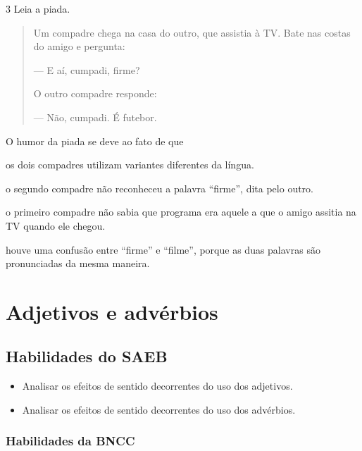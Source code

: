 \num{3} Leia a piada.

\begin{quote}
Um compadre chega na casa do outro, que assistia à TV. Bate nas costas do amigo e pergunta:

--- E aí, cumpadi, firme?

O outro compadre responde:

--- Não, cumpadi. É futebor.

\end{quote}

O humor da piada se deve ao fato de que

\begin{escolha}[itemsep=-5pt]
\item os dois compadres utilizam variantes diferentes da língua.

\item o segundo compadre não reconheceu a palavra ``firme'', dita pelo outro.

\item o primeiro compadre não sabia que programa era aquele a que o amigo assitia na TV quando ele chegou.

\item houve uma confusão entre ``firme'' e ``filme'', porque as duas palavras são pronunciadas da mesma maneira.
\end{escolha}

\chapter{Adjetivos e advérbios}


\section{Habilidades do SAEB}

\begin{itemize}
  \item Analisar os efeitos de sentido decorrentes do uso dos adjetivos.
  \item Analisar os efeitos de sentido decorrentes do uso dos advérbios.
\end{itemize}

\subsection{Habilidades da BNCC}

